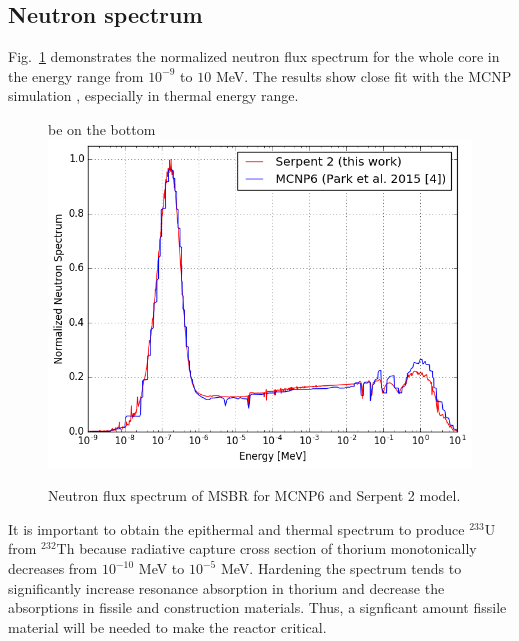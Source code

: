 \documentclass{anstrans}
\begin{document}
\subsection{Neutron spectrum}
Fig.~\ref{fig:spectrum} demonstrates the normalized neutron flux spectrum for 
the whole core in the energy range from $10^{-9}$ to $10$ MeV. The results show 
close fit with the MCNP simulation \cite{park_whole_2015}, especially in 
thermal energy range.  \begin{figure}[h!] %
        be on the bottom
  \centering
  \includegraphics[width=1.05\linewidth]{figure_3_1.png} \caption{Neutron flux 
  spectrum of \gls{MSBR} for MCNP6 and Serpent 2 model.}
  \label{fig:spectrum}
\end{figure}
It is important to obtain the epithermal and thermal spectrum to produce 
$^{233}$U from $^{232}$Th because radiative capture cross section of thorium 
monotonically decreases from $10^{-10}$ MeV to $10^{-5}$ MeV. Hardening the 
spectrum tends to significantly increase resonance absorption in thorium and 
decrease the absorptions in fissile and construction materials. Thus, a 
signficant amount fissile material will be needed to make the reactor critical.
\end{document}
